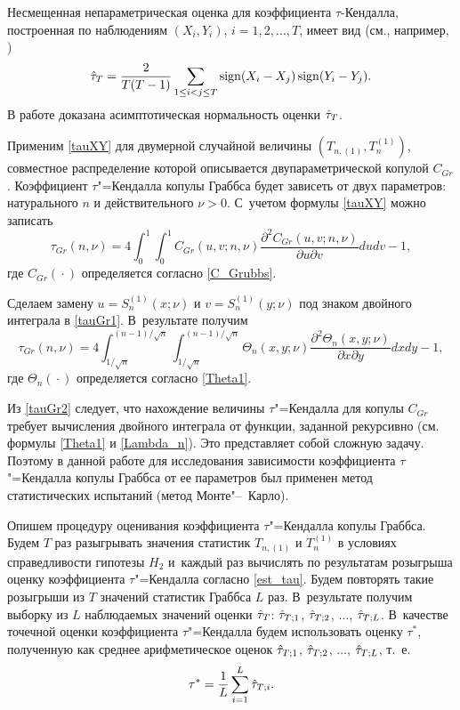 Несмещенная непараметрическая оценка для коэффициента  $\tau$-Кендалла, построенная по наблюдениям  $(X_i,Y_i)$,
$i=1, 2,\ldots, T$,  имеет вид (см., например, \cite{Ferg})
\begin{equation}
\label{est_tau}
\Hat{\tau}_{T}=\frac{2}{T(T-1)}\sum_{1\le i<j\le T} \mathop{\rm sign}(X_i-X_j)\mathop{\rm sign}(Y_i-Y_j).
\end{equation}
В работе \cite{Grothe} доказана асимптотическая нормальность оценки $\Hat{\tau}_{T}$.



Применим \eqref{tauXY}  для двумерной случайной величины  $(T_{n,(1)},T_{n}^{(1)})$, совместное распределение которой описывается  двупараметрической копулой $C_{Gr}$.  
Коэффициент $\tau$"=Кендалла копулы Граббса будет зависеть от двух параметров: натурального $n$  и  действительного $\nu>0$. 
С~учетом формулы  \eqref{tauXY}  можно записать
\begin{equation}
\label{tauGr1}
\tau_{Gr}(n,\nu)=4\int_0^1\int _0^1C_{Gr}(u,v;n,\nu)\frac{\partial^2C_{Gr}(u,v;n,\nu)}{\partial u\partial v} dudv-1,
\end{equation}
где $C_{Gr}({}\cdot{})$ определяется согласно \eqref{C_Grubbs}.



Сделаем замену $u=S_{n}^{(1)}(x;\nu)$ и $v=S_{n}^{(1)}(y;\nu)$  под знаком двойного интеграла в \eqref{tauGr1}. 
В~результате получим
\begin{equation}
\label{tauGr2}
\tau_{Gr}(n,\nu)=4
\int _{{1}/{\sqrt{n}}}^{({n-1})/{\sqrt{n}}}
\int _{{1}/{\sqrt{n}}}^{({n-1})/{\sqrt{n}}}
\Theta_{n}(x,y;\nu)\frac{\partial^2\Theta_{n}(x,y;\nu)}{\partial x\partial y} dxdy-1,
\end{equation}
 где $\Theta_{n}({}\cdot{})$ определяется согласно \eqref{Theta1}.

Из \eqref{tauGr2} следует, что нахождение величины $\tau$"=Кендалла  для копулы  $C_{Gr}$ требует  вычисления двойного интеграла от функции,
 заданной рекурсивно (см. формулы \eqref{Theta1} и \eqref{Lambda_n}). 
 Это представляет собой сложную задачу.
 Поэтому в данной работе  для исследования  зависимости коэффициента  $\tau$"=Кендалла  копулы Граббса от ее параметров
 был применен метод статистических испытаний  (метод Монте"--~Карло).

 Опишем процедуру оценивания коэффициента $\tau$"=Кендалла копулы Граб\-б\-са. 
 Будем $T$ раз разыгрывать  значения статистик
 $T_{n,(1)}$ и $T_{n}^{(1)}$  в условиях справедливости гипотезы $H_2$ и~каждый раз вычислять по результатам розыгрыша
 оценку коэффициента $\tau$"=Кендалла согласно \eqref{est_tau}. 
 Будем повторять такие розыгрыши из $T$ значений статистик
 Граббса $L$ раз.  
 В~результате получим выборку из  $L$ наблюдаемых значений оценки $\Hat{\tau}_{T}$:
 $\Hat{\tau}_{T;1}$, $\Hat{\tau}_{T;2}$, $\ldots$, $\Hat{\tau}_{T;L}$. 
 В~качестве точечной оценки коэффициента $\tau$"=Кендалла будем использовать оценку
$\tau^*$, полученную как среднее арифметическое оценок  
$\Hat{\tau}_{T;1}$, $\Hat{\tau}_{T;2}$, $\ldots$, $\Hat{\tau}_{T;L}$, т.~е.
 \begin{gather}
\label{star_tau}
\tau^{*}=\frac{1}{L}\sum_{i=1}^{L}\Hat{\tau}_{T;i}.
\end{gather}

